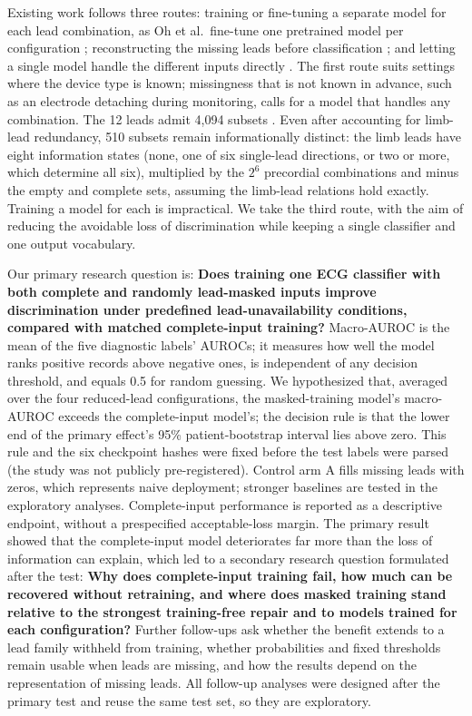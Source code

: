 Existing work follows three routes: training or fine-tuning a separate model for each lead combination, as Oh et al.\ fine-tune one pretrained model per configuration \citep{oh2022leadagnostic}; reconstructing the missing leads before classification \citep{lence2025ecgrecover}; and letting a single model handle the different inputs directly \citep{fast2026af,liu2025kmerl}. The first route suits settings where the device type is known; missingness that is not known in advance, such as an electrode detaching during monitoring, calls for a model that handles any combination. The 12 leads admit 4,094 subsets \citep{zhang2026subsetbenchmark}. Even after accounting for limb-lead redundancy, 510 subsets remain informationally distinct: the limb leads have eight information states (none, one of six single-lead directions, or two or more, which determine all six), multiplied by the $2^6$ precordial combinations and minus the empty and complete sets, assuming the limb-lead relations hold exactly. Training a model for each is impractical. We take the third route, with the aim of reducing the avoidable loss of discrimination while keeping a single classifier and one output vocabulary.

Our primary research question is: \textbf{Does training one ECG classifier with both complete and randomly lead-masked inputs improve discrimination under predefined lead-unavailability conditions, compared with matched complete-input training?} Macro-AUROC is the mean of the five diagnostic labels' AUROCs; it measures how well the model ranks positive records above negative ones, is independent of any decision threshold, and equals 0.5 for random guessing. We hypothesized that, averaged over the four reduced-lead configurations, the masked-training model's macro-AUROC exceeds the complete-input model's; the decision rule is that the lower end of the primary effect's 95\% patient-bootstrap interval lies above zero. This rule and the six checkpoint hashes were fixed before the test labels were parsed (the study was not publicly pre-registered). Control arm A fills missing leads with zeros, which represents naive deployment; stronger baselines are tested in the exploratory analyses. Complete-input performance is reported as a descriptive endpoint, without a prespecified acceptable-loss margin. The primary result showed that the complete-input model deteriorates far more than the loss of information can explain, which led to a secondary research question formulated after the test: \textbf{Why does complete-input training fail, how much can be recovered without retraining, and where does masked training stand relative to the strongest training-free repair and to models trained for each configuration?} Further follow-ups ask whether the benefit extends to a lead family withheld from training, whether probabilities and fixed thresholds remain usable when leads are missing, and how the results depend on the representation of missing leads. All follow-up analyses were designed after the primary test and reuse the same test set, so they are exploratory.

